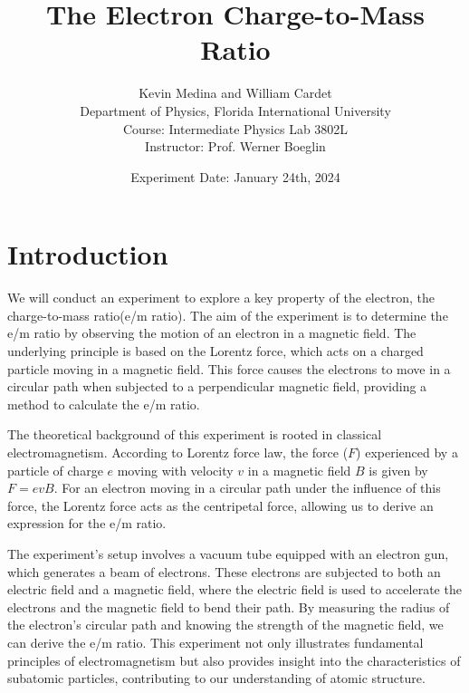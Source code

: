 \documentclass{article}
\title{The Electron Charge-to-Mass Ratio}
\author{Kevin Medina and William Cardet  \\
        Department of Physics, Florida International University \\
        Course: Intermediate Physics Lab 3802L \\
        Instructor: Prof. Werner Boeglin}
\date{Experiment Date: January 24th, 2024}
\begin{document}
\maketitle

\section{Introduction}

We will conduct an experiment to explore a key property of the electron, the charge-to-mass ratio(e/m ratio). The aim of the experiment is to determine the e/m ratio by observing the motion of an electron in a magnetic field. The underlying principle is based on the Lorentz force, which acts on a charged particle moving in a magnetic field. This force causes the electrons to move in a circular path when subjected to a perpendicular magnetic field, providing a method to calculate the e/m ratio.

The theoretical background of this experiment is rooted in classical electromagnetism. According to Lorentz force law, the force (\(F\)) experienced by a particle of charge \(e\) moving with velocity \(v\) in a magnetic field \(B\) is given by \(F = e v B\). For an electron moving in a circular path under the influence of this force, the Lorentz force acts as the centripetal force, allowing us to derive an expression for the e/m ratio.

The experiment's setup involves a vacuum tube equipped with an electron gun, which generates a beam of electrons. These electrons are subjected to both an electric field and a magnetic field, where the electric field is used to accelerate the electrons and the magnetic field to bend their path. By measuring the radius of the electron's circular path and knowing the strength of the magnetic field, we can derive the e/m ratio. This experiment not only illustrates fundamental principles of electromagnetism but also provides insight into the characteristics of subatomic particles, contributing to our understanding of atomic structure.
\end{document}
